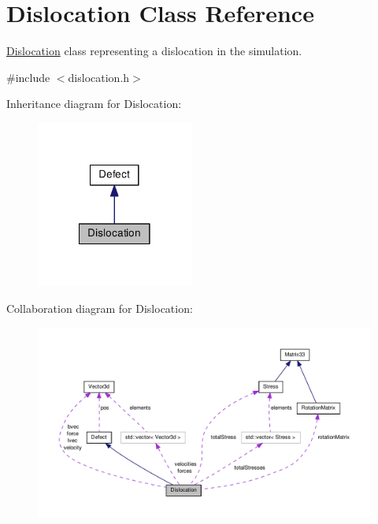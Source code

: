\hypertarget{classDislocation}{\section{Dislocation Class Reference}
\label{d3/dc6/classDislocation}
}


\hyperlink{classDislocation}{Dislocation} class representing a dislocation in the simulation.  




{\ttfamily \#include $<$dislocation.\-h$>$}



Inheritance diagram for Dislocation\-:\nopagebreak
\begin{figure}[H]
\begin{center}
\leavevmode
\includegraphics[width=146pt]{df/dfa/classDislocation__inherit__graph}
\end{center}
\end{figure}


Collaboration diagram for Dislocation\-:
\nopagebreak
\begin{figure}[H]
\begin{center}
\leavevmode
\includegraphics[width=350pt]{d7/d80/classDislocation__coll__graph}
\end{center}
\end{figure}
